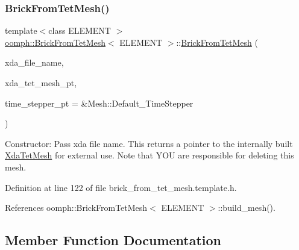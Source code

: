 \subsubsection{\texorpdfstring{Brick\+From\+Tet\+Mesh()}{BrickFromTetMesh()}\hspace{0.1cm}{\footnotesize\ttfamily [3/3]}}
{\footnotesize\ttfamily template$<$class E\+L\+E\+M\+E\+NT $>$ \\
\hyperlink{classoomph_1_1BrickFromTetMesh}{oomph\+::\+Brick\+From\+Tet\+Mesh}$<$ E\+L\+E\+M\+E\+NT $>$\+::\hyperlink{classoomph_1_1BrickFromTetMesh}{Brick\+From\+Tet\+Mesh} (\begin{DoxyParamCaption}\item[{const std\+::string}]{xda\+\_\+file\+\_\+name,  }\item[{\hyperlink{classoomph_1_1XdaTetMesh}{Xda\+Tet\+Mesh}$<$ T\+Element$<$ 3, 3 $>$ $>$ $\ast$\&}]{xda\+\_\+tet\+\_\+mesh\+\_\+pt,  }\item[{Time\+Stepper $\ast$}]{time\+\_\+stepper\+\_\+pt = {\ttfamily \&Mesh\+:\+:Default\+\_\+TimeStepper} }\end{DoxyParamCaption})\hspace{0.3cm}{\ttfamily [inline]}}



Constructor\+: Pass xda file name. This returns a pointer to the internally built \hyperlink{classoomph_1_1XdaTetMesh}{Xda\+Tet\+Mesh} for external use. Note that Y\+OU are responsible for deleting this mesh. 



Definition at line 122 of file brick\+\_\+from\+\_\+tet\+\_\+mesh.\+template.\+h.



References oomph\+::\+Brick\+From\+Tet\+Mesh$<$ E\+L\+E\+M\+E\+N\+T $>$\+::build\+\_\+mesh().



\subsection{Member Function Documentation}
\mbox{\label{classoomph_1_1BrickFromTetMesh_a9b81e29d3b000f02764bf367fa762bfb}} 
